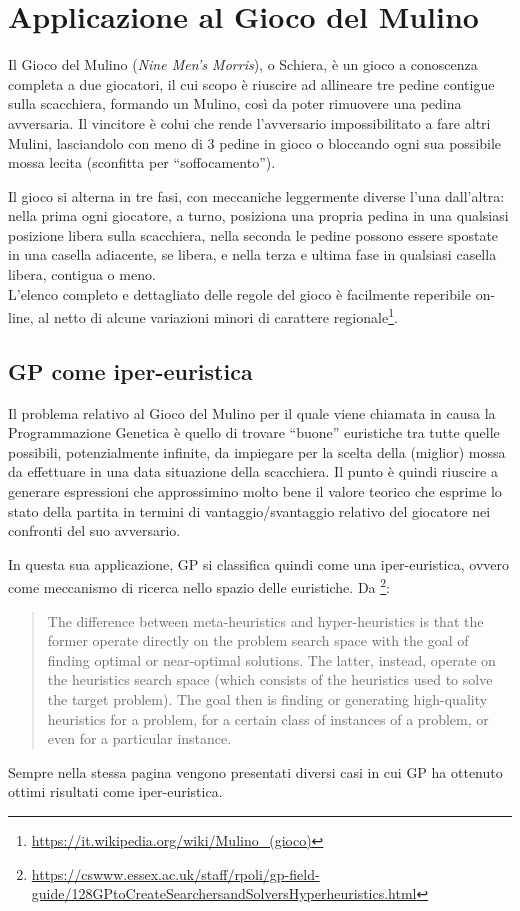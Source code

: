 \documentclass{../llncs}
\begin{document}
\section{Applicazione al Gioco del Mulino}
Il Gioco del Mulino (\emph{Nine Men's Morris}), o Schiera, è un gioco a conoscenza completa a due giocatori, il cui scopo è riuscire ad allineare tre pedine contigue sulla scacchiera, formando un Mulino, così da poter rimuovere una pedina avversaria. Il vincitore è colui che rende l'avversario impossibilitato a fare altri Mulini, lasciandolo con meno di 3 pedine in gioco o bloccando ogni sua possibile mossa lecita (sconfitta per ``soffocamento'').

Il gioco si alterna in tre fasi, con meccaniche leggermente diverse l'una dall'altra: nella prima ogni giocatore, a turno, posiziona una propria pedina in una qualsiasi posizione libera sulla scacchiera, nella seconda le pedine possono essere spostate in una casella adiacente, se libera, e nella terza e ultima fase in qualsiasi casella libera, contigua o meno.\\

L'elenco completo e dettagliato delle regole del gioco è facilmente reperibile on-line, al netto di alcune variazioni minori di carattere regionale\footnote{\url{https://it.wikipedia.org/wiki/Mulino_(gioco)}}.

\subsection{GP come iper-euristica}
Il problema relativo al Gioco del Mulino per il quale viene chiamata in causa la Programmazione Genetica è quello di trovare ``buone'' euristiche tra tutte quelle possibili, potenzialmente infinite, da impiegare per la scelta della (miglior) mossa da effettuare in una data situazione della scacchiera. Il punto è quindi riuscire a generare espressioni che approssimino molto bene il valore teorico che esprime lo stato della partita in termini di vantaggio/svantaggio relativo del giocatore nei confronti del suo avversario.

In questa sua applicazione, GP si classifica quindi come una iper-euristica, ovvero come meccanismo di ricerca nello spazio delle euristiche. Da \footnote{\url{https://cswww.essex.ac.uk/staff/rpoli/gp-field-guide/128GPtoCreateSearchersandSolversHyperheuristics.html}}:
\begin{quote}
The difference between meta-heuristics and hyper-heuristics is that the former operate directly on the problem search space with the goal of finding optimal or near-optimal solutions. The latter, instead, operate on the heuristics search space (which consists of the heuristics used to solve the target problem). The goal then is finding or generating high-quality heuristics for a problem, for a certain class of instances of a problem, or even for a particular instance.
\end{quote}
Sempre nella stessa pagina vengono presentati diversi casi in cui GP ha ottenuto ottimi risultati come iper-euristica.
\end{document}
